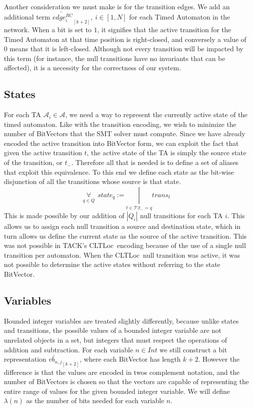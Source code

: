 \documentclass[a4paper,11pt]{report}
\newcommand*\BitOr{\mathbin{|}}
\theoremstyle{definition}
\newcommand{\cltloc}{CLTLoc}
\begin{document}
Another consideration we must make is for the transition edges. We add an
additional term \(\overleftarrow{edge_{i}^{RC}}_{[k{+}2]},\ i \in [1,N]\) for
each Timed Automaton in the network. When a bit is set to \(1\), it signifies
that the active transition for the Timed Automaton at that time position is
right-closed, and conversely a value of \(0\) means that it is left-closed.
Although not every transition will be impacted by this term (for instance, the
null transitions have no invariants that can be affected), it is a necessity for
the correctness of our system.


\subsection{States}\label{encoding-states}

For each TA \(\mathcal{A}_i \in \mathcal{A}\), we need a way to represent the
currently active state of the timed automaton. Like with the transition
encoding, we wish to minimize the number of BitVectors that the SMT solver must
compute. Since we have already encoded the active transition into BitVector
form, we can exploit the fact that given the active transition \(t\), the active
state of the TA is simply the source state of the transition, or \(t_{-}\).
Therefore all that is needed is to define a set of aliases that exploit this
equivalence. To this end we define each state as the bit-wise disjunction of all
the transitions whose source is that state.
\[\underset{q \in Q}{\forall}\ \ state_q := \underset{t \in \mathcal{T}|t_{-} = q}{\BitOr}trans_t\]
This is made possible by our
addition of $|Q_{i}|$ null transitions for each TA $i$. This allows us to assign
each null transition a source and destination state, which in turn allows us
define the current state as the source of the active transition. This was not
possible in TACK's \cltloc\ encoding because of the use of a single null
transition per automaton. When the \cltloc\ null transition was active, it was
not possible to determine the active states without referring to the state
BitVector.

\subsection{Variables}\label{encoding-variables}

Bounded integer variables are treated slightly differently, because unlike
states and transitions, the possible values of a bounded integer variable are
not unrelated objects in a set, but integers that must respect the operations of
addition and subtraction. For each variable \(n \in Int\) we still construct a
bit representation \(\overleftarrow{vb_{n,j}}_{[k+2]}\), where each BitVector
has length \(k+2\). However the difference is that the values are encoded in twos
complement notation, and the number of BitVectors is chosen so that the vectors
are capable of representing the entire range of values for the given bounded
integer variable. We will define \(\lambda(n)\) as the number of bits needed for
each variable \(n\).
\end{document}
